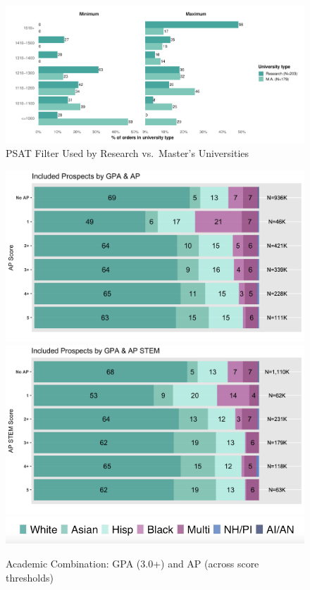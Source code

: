\documentclass[
  12pt,
]{article}
\begin{document}
\pagebreak

\begin{figure}
\centering
\includegraphics{eepa_student_list_manuscript_online_appendix_files/figure-latex/orders-psat-1.pdf}
\caption{\label{fig:orders-psat}PSAT Filter Used by Research vs.~Master's Universities}
\end{figure}

\pagebreak

\begin{figure}

{\centering \includegraphics[width=0.8\linewidth]{./../../outputs/figures/combo3_inc_apv2} \includegraphics[width=0.8\linewidth]{./../../outputs/figures/combo3_inc_apstemv2} \includegraphics[width=0.8\linewidth]{./../../outputs/figures/legend_horizontal} 

}

\caption{Academic Combination: GPA (3.0+) and AP (across score thresholds)}\label{fig:gpa-ap}
\end{figure}
\end{document}
